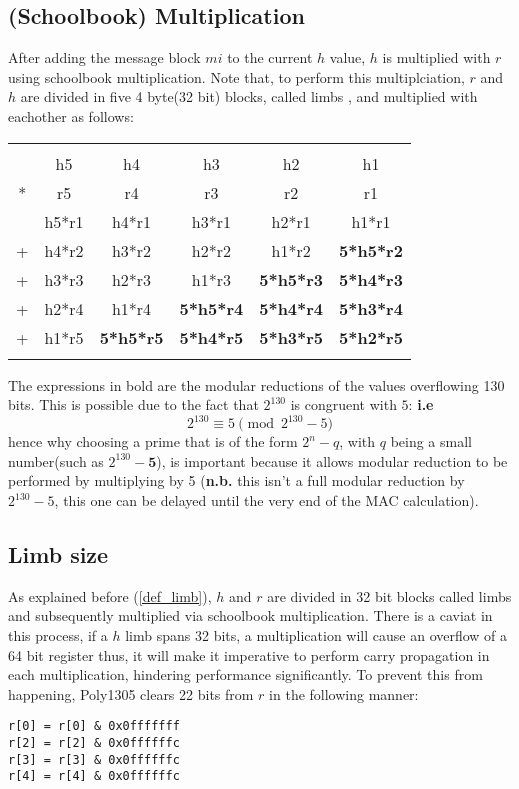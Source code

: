 \documentclass[twocolumn]{article}
\begin{document}
\subsection{(Schoolbook) Multiplication}
After adding the message block $mi$ to the current $h$ value, $h$ is multiplied with $r$ using schoolbook multiplication. Note that, to perform this multiplciation, 
$r$ and $h$ are divided in five 4 byte(32 bit) blocks, called limbs \label{def_limb}, and multiplied with eachother as follows:
\begin{footnotesize}
\begin{tabular}{cccccc}
    &    &    &    &    &    \\
    & h5 & h4 & h3 & h2 & h1 \\
*   & r5 & r4 & r3 & r2 & r1 \\
\hline
    & h5*r1 & h4*r1 & h3*r1 & h2*r1 & h1*r1 \\
+   & h4*r2 & h3*r2 & h2*r2 & h1*r2 & \textbf{5*h5*r2} \\
+   & h3*r3 & h2*r3 & h1*r3 & \textbf{5*h5*r3} & \textbf{5*h4*r3} \\
+   & h2*r4 & h1*r4 & \textbf{5*h5*r4} & \textbf{5*h4*r4} & \textbf{5*h3*r4} \\
+   & h1*r5 & \textbf{5*h5*r5} & \textbf{5*h4*r5} & \textbf{5*h3*r5} & \textbf{5*h2*r5}\\
    &    &    &    &    &    \\
\end{tabular}
\end{footnotesize}
The expressions in bold are the modular reductions of the values overflowing 130 bits. This is possible due to the fact that $2^{130}$ is congruent with $5$:
\textbf{i.e} $$2^{130} \equiv 5 \pmod{2^{130}-5}$$ hence why choosing a prime that is of the form $2^n-q$, with $q$ being a small number(such as $2^{130}-\textbf{5}$), 
is important because it allows modular reduction to be performed by multiplying by 5 (\textbf{n.b.} this isn't a full modular reduction by $2^{130}-5$, this one can be 
delayed until the very end of the MAC calculation).

\subsection{Limb size}
As explained before (\ref{def_limb}), $h$ and $r$ are divided in 32 bit blocks called limbs and subsequently multiplied via schoolbook multiplication. There is a caviat
in this process, if a $h$ limb spans 32 bits, a multiplication will cause an overflow of a 64 bit register thus, it will make it imperative to perform carry propagation
in each multiplication, hindering performance significantly. To prevent this from happening, Poly1305 clears 22 bits from $r$ in the following manner:
\begin{verbatim}
r[0] = r[0] & 0x0fffffff
r[2] = r[2] & 0x0ffffffc
r[3] = r[3] & 0x0ffffffc
r[4] = r[4] & 0x0ffffffc
\end{verbatim}
\end{document}
